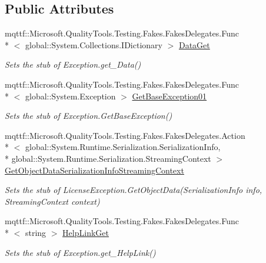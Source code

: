 \subsection*{Public Attributes}
\begin{DoxyCompactItemize}
\item 
mqttf\-::\-Microsoft.\-Quality\-Tools.\-Testing.\-Fakes.\-Fakes\-Delegates.\-Func\\*
$<$ global\-::\-System.\-Collections.\-I\-Dictionary $>$ \hyperlink{class_system_1_1_component_model_1_1_fakes_1_1_stub_license_exception_aedba5bd1157cfb8c1e17421e21b564e7}{Data\-Get}
\begin{DoxyCompactList}\small\item\em Sets the stub of Exception.\-get\-\_\-\-Data()\end{DoxyCompactList}\item 
mqttf\-::\-Microsoft.\-Quality\-Tools.\-Testing.\-Fakes.\-Fakes\-Delegates.\-Func\\*
$<$ global\-::\-System.\-Exception $>$ \hyperlink{class_system_1_1_component_model_1_1_fakes_1_1_stub_license_exception_a99402ca8aa002b8ee2ae2bb9e5539680}{Get\-Base\-Exception01}
\begin{DoxyCompactList}\small\item\em Sets the stub of Exception.\-Get\-Base\-Exception()\end{DoxyCompactList}\item 
mqttf\-::\-Microsoft.\-Quality\-Tools.\-Testing.\-Fakes.\-Fakes\-Delegates.\-Action\\*
$<$ global\-::\-System.\-Runtime.\-Serialization.\-Serialization\-Info, \\*
global\-::\-System.\-Runtime.\-Serialization.\-Streaming\-Context $>$ \hyperlink{class_system_1_1_component_model_1_1_fakes_1_1_stub_license_exception_a95bf49f6cbe1fe3ed76bb5db992c5b52}{Get\-Object\-Data\-Serialization\-Info\-Streaming\-Context}
\begin{DoxyCompactList}\small\item\em Sets the stub of License\-Exception.\-Get\-Object\-Data(\-Serialization\-Info info, Streaming\-Context context)\end{DoxyCompactList}\item 
mqttf\-::\-Microsoft.\-Quality\-Tools.\-Testing.\-Fakes.\-Fakes\-Delegates.\-Func\\*
$<$ string $>$ \hyperlink{class_system_1_1_component_model_1_1_fakes_1_1_stub_license_exception_a77b48dafce0639ec965f0f05b62a17dd}{Help\-Link\-Get}
\begin{DoxyCompactList}\small\item\em Sets the stub of Exception.\-get\-\_\-\-Help\-Link()\end{DoxyCompactList}\item 

\end{DoxyCompactItemize}
